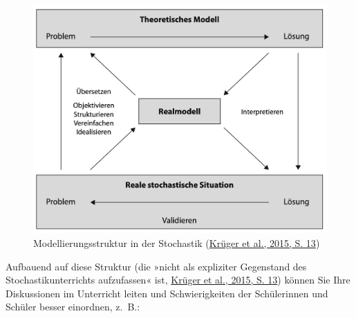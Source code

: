 \documentclass[
  ngerman,
]{scrbook}
\theoremstyle{definition}
\theoremstyle{definition}
\theoremstyle{definition}
\theoremstyle{definition}
\theoremstyle{remark}
\begin{document}
\begin{figure}

{\centering \includegraphics[width=0.75\linewidth]{pictures/E-Modelle} 

}

\caption{Modellierungsstruktur in der Stochastik (\protect\hyperlink{ref-Kruger2015}{Krüger et al., 2015, S. 13})}\label{fig:Modelle}
\end{figure}

Aufbauend auf diese Struktur (die »nicht als expliziter Gegenstand des Stochastikunterrichts aufzufassen« ist, \protect\hyperlink{ref-Kruger2015}{Krüger et al., 2015, S. 13}) können Sie Ihre Diskussionen im Unterricht leiten und Schwierigkeiten der Schülerinnen und Schüler besser einordnen, z.~B.:
\end{document}
